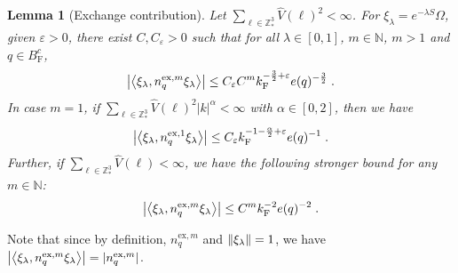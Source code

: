 \documentclass[12pt,a4paper]{article}
\numberwithin{equation}{section}
\newcommand{\NNN}{\mathbb{N}}
\newcommand{\1}{\mathbb{I}}
\newcommand{\ex}{\mathrm{ex}}
\newcommand{\F}{\mathrm{F}}
\newcommand{\Z}{\mathbb{Z}}
\newcommand{\eva}[1]{\left\langle #1 \right\rangle}
\theoremstyle{plain}
\newtheorem{lemma}[theorem]{Lemma}
\theoremstyle{definition}
\theoremstyle{remark}
\theoremstyle{plain}
\theoremstyle{definition}
\theoremstyle{remark}
\begin{document}
\begin{lemma}[Exchange contribution] \label{lem:estnqex}
Let $ \sum_{\ell \in \Z^3_*} \hat{V}(\ell)^2 < \infty $. For $\xi_\lambda = e^{-\lambda S} \Omega$, given $ \varepsilon > 0 $, there exist $ C, C_\varepsilon > 0 $ such that for all $ \lambda \in [0,1] $, $ m \in \NNN $, $ m > 1 $ and $ q \in B_{\F}^c $,
\begin{equation}
	\abs{\eva{\xi_\lambda, n_q^{\ex,m} \xi_\lambda }}
	\leq C_\varepsilon C^m k_{\F}^{-\frac 32 + \varepsilon} e(q)^{-\frac 32} \;. \label{eq:estnqex_Coulomb}
\end{equation}
In case $ m = 1 $, if $ \sum_{\ell \in \Z^3_*} \hat{V}(\ell)^2 |k|^\alpha < \infty $ with $ \alpha \in [0,2] $, then we have
\begin{equation}
	\abs{\eva{\xi_\lambda, n_q^{\ex,1} \xi_\lambda }}
	\leq C_\varepsilon k_{\F}^{-1 - \frac{\alpha}{2} + \varepsilon} e(q)^{-1} \;. \label{eq:estnqex_Coulomb_1}
\end{equation}
Further, if $ \sum_{\ell \in \Z^3_*} \hat{V}(\ell) < \infty $, we have the following stronger bound for any $ m \in \mathbb{N} $:
\begin{equation}
	\abs{\eva{\xi_\lambda, n_q^{\ex,m} \xi_\lambda }}
	\leq C^m k_{\F}^{-2} e(q)^{-2} \;. \label{eq:estnqex}
\end{equation}
\end{lemma}

Note that since by definition, $ n_q^{\ex,m} $ and $ \norm{\xi_\lambda} = 1 $, we have $ \abs{\eva{\xi_\lambda, n_q^{\ex,m} \xi_\lambda }} = |n_q^{\ex,m}| $.
\end{document}
